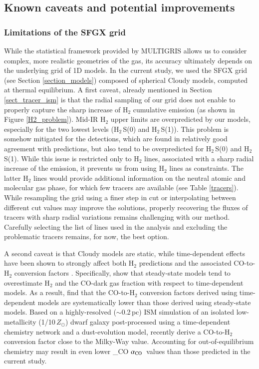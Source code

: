 \documentclass{aa}
\newcommand{\alphaCO}{\ifmmode \alpha_{\rm CO} \else $\alpha_{\rm CO}$\fi}
\begin{document}
\subsection{Known caveats and potential improvements}
\label{discussion_limits}



\subsubsection{Limitations of the SFGX grid}

While the statistical framework provided by MULTIGRIS allows us to consider complex, more realistic geometries of the gas, its accuracy ultimately depends on the underlying grid of 1D models. In the current study, we used the SFGX grid (see Section \ref{section_models}) composed of spherical Cloudy models, computed at thermal equilibrium. A first caveat, already mentioned in Section \ref{sect_tracer_ism} is that the radial sampling of our grid does not enable to properly capture the sharp increase of H$_2$ cumulative emission (as shown in Figure \ref{H2_problem}). Mid-IR H$_2$ upper limits are overpredicted by our models, especially for the two lowest levels (H$_2$\,S(0) and H$_2$\,S(1)). This problem is somehow mitigated for the detections, which are found in relatively good agreement with predictions, but also tend to be overpredicted for H$_2$\,S(0) and H$_2$\,S(1). While this issue is restricted only to H$_2$ lines, associated with a sharp radial increase of the emission, it prevents us from using H$_2$ lines as constraints. The latter H$_2$ lines would provide additional information on the neutral atomic and molecular gas phase, for which few tracers are available (see Table \ref{tracers}). While resampling the grid using a finer step in cut or interpolating between different cut values may improve the solutions, properly recovering the fluxes of tracers with sharp radial variations remains challenging with our method. Carefully selecting the list of lines used in the analysis and excluding the problematic tracers remains, for now, the best option. 

A second caveat is that Cloudy models are static, while time-dependent effects have been shown to strongly affect both H$_2$ predictions and the associated CO-to-H$_2$ conversion factors \citep[e.g.,][]{Glover_clark_sf_2012}. Specifically, \cite{Hu_metdep_2021} show that steady-state models tend to overestimate H$_2$ and the CO-dark gas fraction with respect to time-dependent models. As a result, \cite{Hu_XCO_2022} find that the CO-to-H$_2$ conversion factors derived using time-dependent models are systematically lower than those derived using steady-state models. Based on a highly-resolved ($\sim$0.2\,pc) ISM simulation of an isolated low-metallicity (1/10\,$Z_{\odot}$) dwarf galaxy post-processed using a time-dependent chemistry network and a dust-evolution model, \cite{Hu_lowZ_2023} recently derive a CO-to-H$_2$ conversion factor close to the Milky-Way value. Accounting for out-of-equilibrium chemistry may result in even lower \alphaCO\ values than those predicted in the current study.
\end{document}
